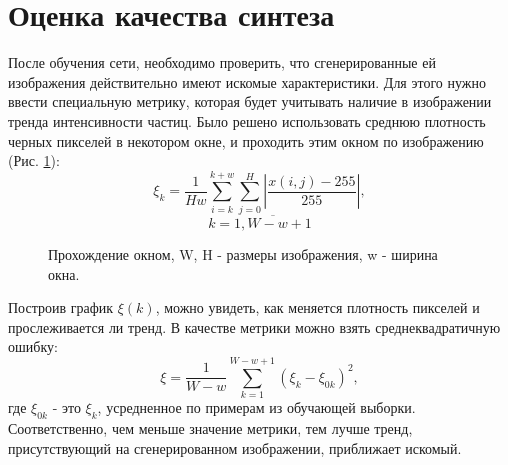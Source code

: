 \section{Оценка качества синтеза}
	После обучения сети, необходимо проверить, что сгенерированные ей изображения действительно имеют искомые характеристики. Для этого нужно ввести специальную метрику, которая будет учитывать наличие в изображении тренда интенсивности частиц. Было решено использовать среднюю плотность черных пикселей в некотором окне, и проходить этим окном по изображению (Рис. \ref{window}):
	\newpage
	$$\xi_k = \frac{1}{H w}{\sum_{i=k}^{k+w} \sum_{j=0}^{H}\left| \frac{x(i, j) - 255}{255} \right|}, $$$$k = \overline{1, W - w + 1} $$
	\begin{figure}
		\caption{Прохождение окном, W, H - размеры изображения, w - ширина окна.}
		\label{window}
	\end{figure}
	
	Построив график $\xi(k)$, можно увидеть, как меняется плотность пикселей и прослеживается ли тренд. В качестве метрики можно взять среднеквадратичную ошибку:
	$$ \xi = \frac{1}{W-w}\sum_{k=1}^{W-w+1} (\xi_k - \xi_{0k})^2,$$
	где $\xi_{0k}$ - это $\xi_k$, усредненное по примерам из обучающей выборки. Соответственно, чем меньше значение метрики, тем лучше тренд, присутствующий на сгенерированном изображении, приближает искомый.